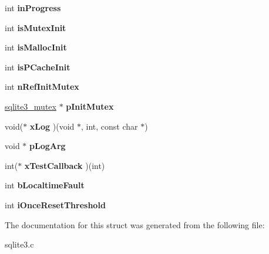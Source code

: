 \begin{DoxyCompactItemize}
\item 
int {\bfseries in\+Progress}\hypertarget{structSqlite3Config_a3cc1f0564475ead1840892e8ac6989ed}{}\label{structSqlite3Config_a3cc1f0564475ead1840892e8ac6989ed}

\item 
int {\bfseries is\+Mutex\+Init}\hypertarget{structSqlite3Config_af576d567cc36956e0c4c3a7487b53edf}{}\label{structSqlite3Config_af576d567cc36956e0c4c3a7487b53edf}

\item 
int {\bfseries is\+Malloc\+Init}\hypertarget{structSqlite3Config_ab0ec050075ee245df0a54623b0073bfc}{}\label{structSqlite3Config_ab0ec050075ee245df0a54623b0073bfc}

\item 
int {\bfseries is\+P\+Cache\+Init}\hypertarget{structSqlite3Config_a945ec3af8fd8f2efaccec88e2597393b}{}\label{structSqlite3Config_a945ec3af8fd8f2efaccec88e2597393b}

\item 
int {\bfseries n\+Ref\+Init\+Mutex}\hypertarget{structSqlite3Config_a423f5c1b3f68d9c569661a542ebe7220}{}\label{structSqlite3Config_a423f5c1b3f68d9c569661a542ebe7220}

\item 
\hyperlink{structsqlite3__mutex}{sqlite3\+\_\+mutex} $\ast$ {\bfseries p\+Init\+Mutex}\hypertarget{structSqlite3Config_af8ffb8388972c384840dd36beca35e7e}{}\label{structSqlite3Config_af8ffb8388972c384840dd36beca35e7e}

\item 
void($\ast$ {\bfseries x\+Log} )(void $\ast$, int, const char $\ast$)\hypertarget{structSqlite3Config_a3d9750f6c4fc73fdce5f83357184faae}{}\label{structSqlite3Config_a3d9750f6c4fc73fdce5f83357184faae}

\item 
void $\ast$ {\bfseries p\+Log\+Arg}\hypertarget{structSqlite3Config_a501ab4552bc7c54bb413aced5889dcdc}{}\label{structSqlite3Config_a501ab4552bc7c54bb413aced5889dcdc}

\item 
int($\ast$ {\bfseries x\+Test\+Callback} )(int)\hypertarget{structSqlite3Config_a6d21468c424041f10eb0c251220088f6}{}\label{structSqlite3Config_a6d21468c424041f10eb0c251220088f6}

\item 
int {\bfseries b\+Localtime\+Fault}\hypertarget{structSqlite3Config_a7bdc3109ecd839317f722b5da5339fab}{}\label{structSqlite3Config_a7bdc3109ecd839317f722b5da5339fab}

\item 
int {\bfseries i\+Once\+Reset\+Threshold}\hypertarget{structSqlite3Config_aed7a7e3bd6862ff2ca1444e16ad3948f}{}\label{structSqlite3Config_aed7a7e3bd6862ff2ca1444e16ad3948f}

\end{DoxyCompactItemize}


The documentation for this struct was generated from the following file\+:\begin{DoxyCompactItemize}
\item 
sqlite3.\+c\end{DoxyCompactItemize}
